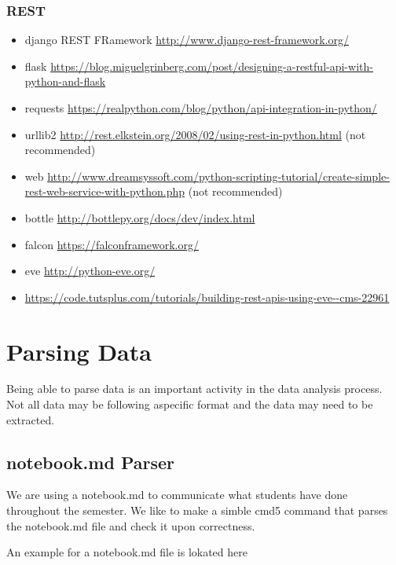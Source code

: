 \begin{exercise}
\begin{exercise}
\subsubsection{REST}\label{rest}

\begin{itemize}
\tightlist
\item
  django REST FRamework \url{http://www.django-rest-framework.org/}
\item
  flask
  \url{https://blog.miguelgrinberg.com/post/designing-a-restful-api-with-python-and-flask}
\item
  requests
  \url{https://realpython.com/blog/python/api-integration-in-python/}
\item
  urllib2
  \url{http://rest.elkstein.org/2008/02/using-rest-in-python.html} (not
  recommended)
\item
  web
  \url{http://www.dreamsyssoft.com/python-scripting-tutorial/create-simple-rest-web-service-with-python.php}
  (not recommended)
\item
  bottle \url{http://bottlepy.org/docs/dev/index.html}
\item
  falcon \url{https://falconframework.org/}
\item
  eve \url{http://python-eve.org/}
\item
  \url{https://code.tutsplus.com/tutorials/building-rest-apis-using-eve--cms-22961}
\end{itemize}

\section{Parsing Data}

Being able to parse data is an important activity in the data analysis
process. Not all data may be following aspecific format and the data
may need to be extracted.

\subsection{notebook.md Parser}

We are using a notebook.md to communicate what students have done
throughout the semester. We like to make a simble cmd5 command that
parses the notebook.md file and check it upon correctness.

An example for a notebook.md file is lokated here 



\end{exercise}
\end{exercise}
